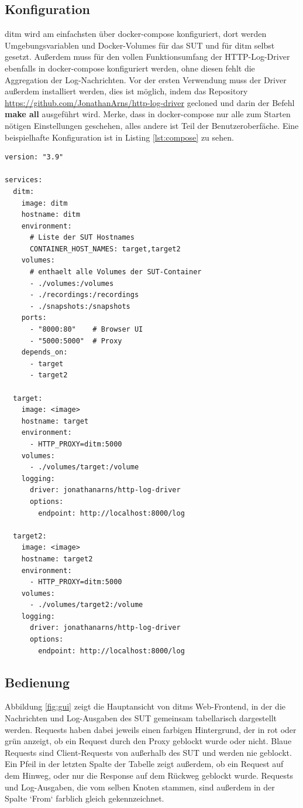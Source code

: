 \documentclass[12pt,a4paper]{report}
\begin{document}
\subsection{Konfiguration}
ditm wird am einfachsten über docker-compose konfiguriert, dort werden Umgebungsvariablen und Docker-Volumes für das SUT und für
ditm selbst gesetzt. Außerdem muss für den vollen Funktionsumfang der HTTP-Log-Driver ebenfalls in docker-compose konfiguriert
werden, ohne diesen fehlt die Aggregation der Log-Nachrichten. Vor der ersten Verwendung muss der Driver außerdem installiert
werden, dies ist möglich, indem das Repository \url{https://github.com/JonathanArns/http-log-driver} gecloned und darin der Befehl
\textbf{make all} ausgeführt wird. Merke, dass in docker-compose nur alle zum Starten nötigen Einstellungen geschehen, alles andere ist Teil
der Benutzeroberfäche. Eine beispielhafte Konfiguration ist in Listing \ref{lst:compose} zu sehen.
\begin{lstlisting}[caption={Beispiel für ditms Konfiguration mit docker-compose}, label={lst:compose}]
version: "3.9"

services:
  ditm:
    image: ditm
    hostname: ditm
    environment:
      # Liste der SUT Hostnames
      CONTAINER_HOST_NAMES: target,target2  
    volumes:
      # enthaelt alle Volumes der SUT-Container
      - ./volumes:/volumes  
      - ./recordings:/recordings
      - ./snapshots:/snapshots
    ports:
      - "8000:80"    # Browser UI
      - "5000:5000"  # Proxy
    depends_on:
      - target
      - target2
  
  target:
    image: <image>
    hostname: target
    environment: 
      - HTTP_PROXY=ditm:5000
    volumes:
      - ./volumes/target:/volume
    logging:
      driver: jonathanarns/http-log-driver
      options:
        endpoint: http://localhost:8000/log

  target2:
    image: <image>
    hostname: target2
    environment: 
      - HTTP_PROXY=ditm:5000
    volumes:
      - ./volumes/target2:/volume
    logging:
      driver: jonathanarns/http-log-driver
      options:
        endpoint: http://localhost:8000/log
\end{lstlisting}

\subsection{Bedienung}
Abbildung \ref{fig:gui} zeigt die Hauptansicht von ditms Web-Frontend, in der die Nachrichten und Log-Ausgaben des SUT gemeinsam
tabellarisch dargestellt werden. Requests haben dabei jeweils einen farbigen Hintergrund, der in rot oder grün anzeigt, ob ein
Request durch den Proxy geblockt wurde oder nicht. Blaue Requests sind Client-Requests von außerhalb des SUT und werden nie
geblockt. Ein Pfeil in der letzten Spalte der Tabelle zeigt außerdem, ob ein Request auf dem Hinweg, oder nur die Response auf
dem Rückweg geblockt wurde. Requests und Log-Ausgaben, die vom selben Knoten stammen, sind außerdem in der Spalte `From` farblich
gleich gekennzeichnet.
\end{document}
